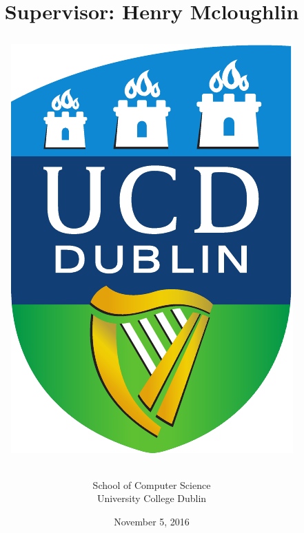 \documentclass{article}
\title{
\vspace{0.3in}
\textbf{\hmwkTitle}
\vspace{1in}\\
\textmd{\textbf{\hmwkClass}}\\\ \\
\normalsize\
\vspace{0.4in}
\textmd{\textbf{\hmwkAuthorName}}\\
\vspace{0.1in}
\small{\hmwkDesc}\\
\vspace{0.05in}
\small{\textbf{Supervisor}: Henry Mcloughlin}
\vspace{.5in}
\begin{center}
\includegraphics[width=0.3\columnwidth]{UCD_Logo} %
\end{center}
}
\author{School of Computer Science\\University College Dublin}
\date{\small{November 5, 2016}} %
\begin{document}
\begin{titlepage}
\maketitle
\thispagestyle{empty}
\end{titlepage}

\newpage


\newpage
\tableofcontents

\newpage

\end{document}

